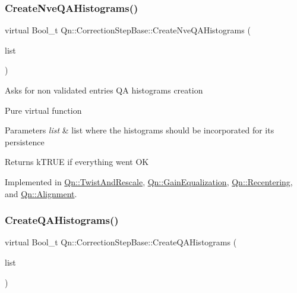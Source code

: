 \mbox{\label{classQn_1_1CorrectionStepBase_acb488e715005f027e39c21ae5f4684da}} 
\subsubsection{\texorpdfstring{Create\+Nve\+Q\+A\+Histograms()}{CreateNveQAHistograms()}}
{\footnotesize\ttfamily virtual Bool\+\_\+t Qn\+::\+Correction\+Step\+Base\+::\+Create\+Nve\+Q\+A\+Histograms (\begin{DoxyParamCaption}\item[{T\+List $\ast$}]{list }\end{DoxyParamCaption})\hspace{0.3cm}{\ttfamily [pure virtual]}}

Asks for non validated entries QA histograms creation

Pure virtual function 
\begin{DoxyParams}{Parameters}
{\em list} & list where the histograms should be incorporated for its persistence \\
\hline
\end{DoxyParams}
\begin{DoxyReturn}{Returns}
k\+T\+R\+UE if everything went OK 
\end{DoxyReturn}


Implemented in \mbox{\hyperlink{classQn_1_1TwistAndRescale_ae60ae563330df4beb9edd3fb99a9fc31}{Qn\+::\+Twist\+And\+Rescale}}, \mbox{\hyperlink{classQn_1_1GainEqualization_aede344344f1f7009f10fc798cfa3241b}{Qn\+::\+Gain\+Equalization}}, \mbox{\hyperlink{classQn_1_1Recentering_a79b742c62efee3462e65cad7089b1b54}{Qn\+::\+Recentering}}, and \mbox{\hyperlink{classQn_1_1Alignment_ac11ae0ae7f1ea1e1b8408d73469d54d1}{Qn\+::\+Alignment}}.

\mbox{\label{classQn_1_1CorrectionStepBase_a21f58f5d91209c1c74d0928cf0b3e26d}} 
\subsubsection{\texorpdfstring{Create\+Q\+A\+Histograms()}{CreateQAHistograms()}}
{\footnotesize\ttfamily virtual Bool\+\_\+t Qn\+::\+Correction\+Step\+Base\+::\+Create\+Q\+A\+Histograms (\begin{DoxyParamCaption}\item[{T\+List $\ast$}]{list }\end{DoxyParamCaption})\hspace{0.3cm}{\ttfamily [pure virtual]}}

